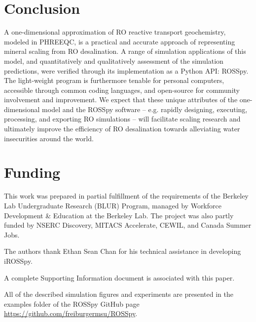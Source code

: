 \documentclass[journal=ACSES&TWater,manuscript=article]{achemso}
\begin{document}
\section{Conclusion}

A one-dimensional approximation of RO reactive transport geochemistry, modeled in PHREEQC, is a practical and accurate approach of representing mineral scaling from RO desalination. A range of simulation applications of this model, and quantitatively and qualitatively assessment of the simulation predictions, were verified through its implementation as a Python API: ROSSpy. The light-weight program is furthermore tenable for personal computers, accessible through common coding languages, and open-source for community involvement and improvement. We expect that these unique attributes of the one-dimensional model and the ROSSpy software -- e.g. rapidly designing, executing, processing, and exporting RO simulations -- will facilitate scaling research and ultimately improve the efficiency of RO desalination towards alleviating water insecurities around the world. 


\section{Funding}
This work was prepared in partial fulfillment of the requirements of the Berkeley Lab Undergraduate Research (BLUR) Program, managed by Workforce Development \& Education at the Berkeley Lab. The project was also partly funded by NSERC Discovery, MITACS Accelerate, CEWIL, and Canada Summer Jobs. 

\begin{acknowledgement}

The authors thank Ethan Sean Chan for his technical assistance in developing iROSSpy. 

\end{acknowledgement}

\begin{suppinfo}
A complete Supporting Information document is associated with this paper.

All of the described simulation figures and experiments are presented in the examples folder of the ROSSpy GitHub page \url{https://github.com/freiburgermsu/ROSSpy}.

\end{suppinfo}


\end{document}
